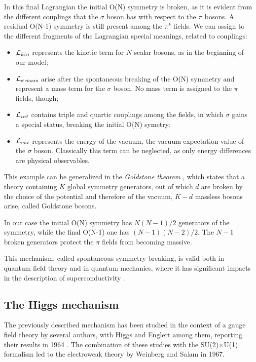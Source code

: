 In this final Lagrangian the initial O(N) symmetry is broken, as it is evident from the different couplings that the $\sigma$ boson has with respect to the $\pi$ bosons. A residual O(N-1) symmetry is still present among the $\pi^k$ fields.
We can assign to the different fragments of the Lagrangian special meanings, related to couplings:
\begin{itemize}
\item $\mathcal{L}_{kin}$ represents the kinetic term for $N$ scalar bosons, as in the beginning of our model;
\item $\mathcal{L}_{\sigma \, mass}$ arise after the spontaneous breaking of the O(N) symmetry and represent a mass term for the $\sigma$ boson. No mass term is assigned to the $\pi$ fields, though;
\item $\mathcal{L}_{int}$ contains triple and quartic couplings among the fields, in which $\sigma$ gains a special status, breaking the initial O(N) symetry;
\item $\mathcal{L}_{vac}$ represents the energy of the vacuum, the vacuum expectation value of the $\sigma$ boson. Classically this term can be neglected, as only energy differences are physical observables.
\end{itemize}

This example can be generalized in the \emph{Goldstone theorem} \cite{1962PhRv..127..965G}, which states that a theory containing $K$ global symmetry generators, out of which $d$ are broken by the choice of the potential and therefore of the vacuum, $K - d$ massless bosons arise, called Goldstone bosons. 

In our case the initial O(N) symmetry has $N(N-1)/2$ generators of the symmetry, while the final O(N-1) one has $(N-1)(N-2)/2$. The $N-1$ broken generators protect the $\pi$ fields from becoming massive.

This mechanism, called spontaneous symmetry breaking, is valid both in quantum field theory and in quantum mechanics, where it has significant impacts in the description of superconductivity \cite{Nambu:1960tm}.

\subsection{The Higgs mechanism}

The previously described mechanism has been studied in the context of a gauge field theory by several authors, with Higgs and Englert among them, reporting their results in 1964 \cite{Englert:1964et, Higgs:1964ia}. The combination of these studies with the SU(2)$\times$U(1) formalism led to the electroweak theory by Weinberg and Salam in 1967.

